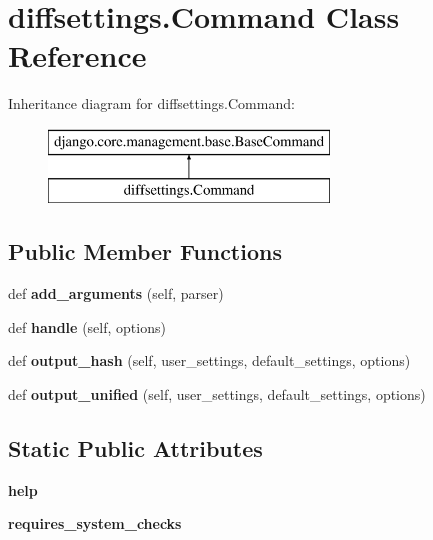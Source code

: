 \hypertarget{classdiffsettings_1_1_command}{}\section{diffsettings.\+Command Class Reference}
\label{classdiffsettings_1_1_command}
Inheritance diagram for diffsettings.\+Command\+:\begin{figure}[H]
\begin{center}
\leavevmode
\includegraphics[height=2.000000cm]{classdiffsettings_1_1_command}
\end{center}
\end{figure}
\subsection*{Public Member Functions}
\begin{DoxyCompactItemize}
\item 
\mbox{\label{classdiffsettings_1_1_command_a87932fd6756aaa2fc4d98366fdb9b1d1}} 
def {\bfseries add\+\_\+arguments} (self, parser)
\item 
\mbox{\label{classdiffsettings_1_1_command_a2edfc9804bd045af03940de63de9684e}} 
def {\bfseries handle} (self, options)
\item 
\mbox{\label{classdiffsettings_1_1_command_a6b4f831205983d306a556a950a7392f7}} 
def {\bfseries output\+\_\+hash} (self, user\+\_\+settings, default\+\_\+settings, options)
\item 
\mbox{\label{classdiffsettings_1_1_command_a5ad996850b07815642483a1eda1e885a}} 
def {\bfseries output\+\_\+unified} (self, user\+\_\+settings, default\+\_\+settings, options)
\end{DoxyCompactItemize}
\subsection*{Static Public Attributes}
\begin{DoxyCompactItemize}
\item 
\mbox{\label{classdiffsettings_1_1_command_a8ffed75c865a40e0e39f1c913b1bb20b}} 
{\bfseries help}
\item 
\mbox{\label{classdiffsettings_1_1_command_a94375ab3f9ef0bdf87bc12f5287a9532}} 
{\bfseries requires\+\_\+system\+\_\+checks}
\end{DoxyCompactItemize}
